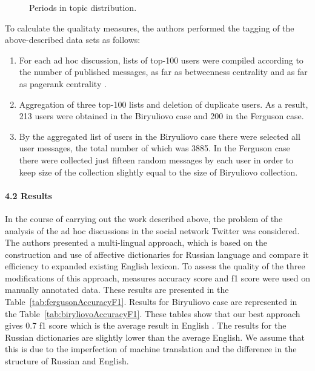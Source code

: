 \begin{figure}[ht]
	\caption{Periods in topic distribution.}\label{fig:biryulievoPublicationActivity}
\end{figure}

To calculate the qualitaty measures, the authors performed the tagging of the above-described data sets as follows:

\begin{enumerate}
	\item For each ad hoc discussion, lists of top-100 users were compiled according to the number of published messages, as far as betweenness centrality and as far as pagerank centrality \cite{BodrunovaLitvinenkoBlekanov}.
	\item Aggregation of three top-100 lists and deletion of duplicate users. As a result, 213 users were obtained in the Biryuliovo case and 200 in the Ferguson case.
	\item By the aggregated list of users in the Biryuliovo case there were selected all user messages, the total number of which was 3885. In the Ferguson case there were collected just fifteen random messages by each user in order to keep size of the collection slightly equal to the size of Biryuliovo collection.
\end{enumerate}

\paragraph{4.2 Results}
In the course of carrying out the work described above, the problem of the analysis of the ad hoc discussions in the social network Twitter was considered. The authors presented a multi-lingual approach, which is based on the construction and use of affective dictionaries for Russian language and compare it efficiency to expanded existing English lexicon. To assess the quality of the three modifications of this approach, measures accuracy score and f1 score were used on manually annotated data. These results are presented in the Table~\cref{tab:fergusonAccuracyF1}. Results for Biryuliovo case are represented in the Table~\cref{tab:biryliovoAccuracyF1}. These tables show that our best approach gives 0.7 f1 score which is the average result in English \cite{KingHopkins,RavichandranRao}. The results for the Russian dictionaries are slightly lower than the average English. We assume that this is due to the imperfection of machine translation and the difference in the structure of Russian and English.

